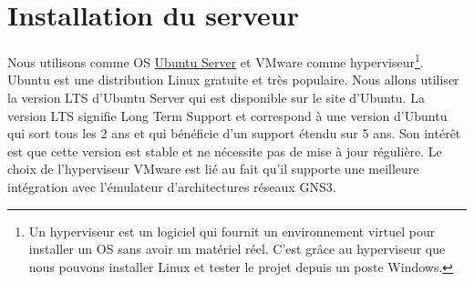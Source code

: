 \documentclass[a4paper,12pt,french]{report} %
\begin{document}
\section{Installation du serveur}
Nous utilisons comme OS \href{https://ubuntu-fr.org/telechargement?variante=server}{Ubuntu Server} et VMware comme hyperviseur\footnote{Un hyperviseur est un logiciel qui fournit un environnement virtuel pour installer un OS sans avoir un matériel réel. C'est grâce au hyperviseur que nous pouvons installer Linux et tester le projet depuis un poste Windows.}. Ubuntu est une distribution Linux gratuite et très populaire. Nous allons utiliser la version  LTS d'Ubuntu Server qui est disponible sur le site d'Ubuntu. La version LTS signifie Long Term Support et correspond à une version d'Ubuntu qui sort tous les 2 ans et qui bénéficie d'un support étendu sur 5 ans. Son intérêt est que cette version est stable et ne nécessite pas de mise à jour régulière. Le choix de l'hyperviseur VMware est lié au fait qu'il supporte une meilleure intégration avec l'émulateur d'architectures réseaux GNS3.%
\end{document}
